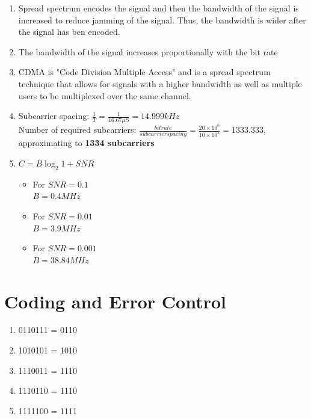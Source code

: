 \documentclass[11pt]{article}
\begin{document}
\begin{enumerate}[label=(\alph*)]
{\begin{enumerate} [label=(\arabic*)]
	\end{enumerate}
}

\item {
	Spread spectrum encodes the signal and then the bandwidth of the signal is increased to reduce jamming of the signal. Thus, 
	the bandwidth is wider after the signal has ben encoded.
}

\item {
	The bandwidth of the signal increases proportionally with the bit rate
}

\item {
	CDMA is "Code Division Multiple Access" and is a spread spectrum technique that allows for signals with a higher bandwidth
	as well as multiple users to be multiplexed over the same channel.
}

\item {
	 Subcarrier spacing: $\frac{1}{T} = \frac{1}{16.67\mu S} = 14.999kHz$ \\
	 Number of required subcarriers: $\frac{bitrate}{subcarrier spacing} = \frac{20 \times 10^6}{10 \times 10^3} = 1333.333$, \\
	 approximating to \textbf{1334 subcarriers}
}

\item {
	$C = B \log_2{1 + SNR}$ \\
	
	\begin{itemize} 
	\item {
		For $SNR = 0.1$ \\
		$B = 0.4MHz$
	}
	
	\item {
		For $SNR = 0.01$ \\
		$B = 3.9MHz$
	}
	
	\item {
		For $SNR = 0.001$ \\
		$B = 38.84MHz$
	}
	\end{itemize}
}
\end{enumerate}
	

\section{Coding and Error Control}
\begin{enumerate}[label=(\alph*)]
\item {0110111 = 0110}

\item {1010101 = 1010}

\item {1110011 = 1110}

\item {1110110 = 1110}

\item {1111100 = 1111} 
\end{enumerate}
\end{document}
